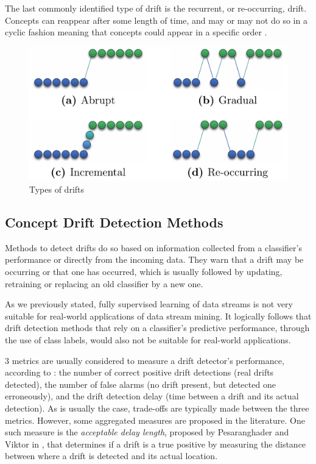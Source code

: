 The last commonly identified type of drift is the recurrent, or re-occurring, drift. Concepts can reappear after some length of time, and may or may not do so in a cyclic fashion meaning that concepts could appear in a specific order \cite{tsymbal2004problem, KRAWCZYK2017132, bifet2018machine}.


\begin{figure}
  \includegraphics[width=\linewidth]{./images/chapter2/concept-drifts}
\caption{\label{fig:concept-drift-types}Types of drifts \cite{pesaranghader2018reservoirthesis}}
\end{figure}

\subsection{Concept Drift Detection Methods}
Methods to detect drifts do so based on information collected from a classifier's performance or directly from the incoming data. They warn that a drift may be occurring or that one has occurred, which is usually followed by updating, retraining or replacing an old classifier by a new one.

As we previously stated, fully supervised learning of data streams is not very suitable for real-world applications of data stream mining. It logically follows that drift detection methods that rely on a classifier's predictive performance, through the use of class labels, would also not be suitable for real-world applications.

3 metrics are usually considered to measure a drift detector's performance, according to \cite{KRAWCZYK2017132}: the number of correct positive drift detections (real drifts detected), the number of false alarms (no drift present, but detected one erroneously), and the drift detection delay (time between a drift and its actual detection).
As is usually the case, trade-offs are typically made between the three metrics. However, some aggregated measures are proposed in the literature. One such measure is the \textit{acceptable delay length}, proposed by Pesaranghader and Viktor in \cite{pesaranghader2016fast}, that determines if a drift is a true positive by measuring the distance between where a drift is detected and its actual location.

